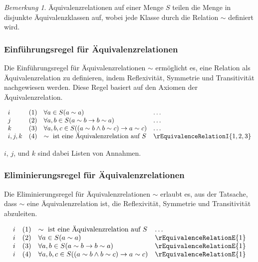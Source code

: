 \documentclass{book}
\theoremstyle{plain}
\theoremstyle{remark}
\newtheorem*{remark}{Bemerkung}
\theoremstyle{definition}
\begin{document}
\begin{remark}
    Äquivalenzrelationen auf einer Menge \(S\) teilen die Menge in disjunkte Äquivalenzklassen auf, wobei jede Klasse durch die Relation \(\sim\) definiert wird.
\end{remark}

\subsubsection*{Einführungsregel für Äquivalenzrelationen}
\label{rule:rEquivalenceRelationI}
Die Einführungsregel für Äquivalenzrelationen \(\sim\) ermöglicht es, eine Relation als Äquivalenzrelation zu definieren, indem Reflexivität, Symmetrie und Transitivität nachgewiesen werden. Diese Regel basiert auf den Axiomen der Äquivalenzrelation.

\[
\begin{array}{llll}
    i       & (1) & \forall a \in S (a \sim a) & \dots \\
    j       & (2) & \forall a, b \in S (a \sim b \rightarrow b \sim a) & \dots \\
    k       & (3) & \forall a, b, c \in S ((a \sim b \land b \sim c) \rightarrow a \sim c) & \dots \\
    i,j,k   & (4) & \sim \text{ ist eine Äquivalenzrelation auf } S & \rEquivalenceRelationI{1,2,3}
\end{array}
\]

\(i\), \(j\), und \(k\) sind dabei Listen von Annahmen.

\subsubsection*{Eliminierungsregel für Äquivalenzrelationen}
\label{rule:rEquivalenceRelationE}
Die Eliminierungsregel für Äquivalenzrelationen \(\sim\) erlaubt es, aus der Tatsache, dass \(\sim\) eine Äquivalenzrelation ist, die Reflexivität, Symmetrie und Transitivität abzuleiten.

\[
\begin{array}{llll}
    i       & (1) & \sim \text{ ist eine Äquivalenzrelation auf } S & \dots \\
    i       & (2) & \forall a \in S (a \sim a) & \rEquivalenceRelationE{1} \\
    i       & (3) & \forall a, b \in S (a \sim b \rightarrow b \sim a) & \rEquivalenceRelationE{1} \\
    i       & (4) & \forall a, b, c \in S ((a \sim b \land b \sim c) \rightarrow a \sim c) & \rEquivalenceRelationE{1}
\end{array}
\]
\end{document}
